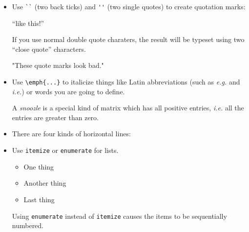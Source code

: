 \documentclass{article}
\begin{document}
\begin{itemize}
\item Use \verb|``| (two back ticks) and \verb|''| (two single quotes)
  to create quotation marks:
\begin{good}
``like this!''
\end{good}
If you use normal double quote charaters, the result will be typeset
using two ``close quote'' characters.
\begin{bad}
"These quote marks look bad."
\end{bad}

\item Use \verb|\emph{...}| to italicize things like Latin abbreviations
  (such as \emph{e.g.} and \emph{i.e.}) or words you are going to
  define.
\begin{good}
A \emph{snoozle} is a special kind of matrix which has all positive entries, \emph{i.e.} all the entries are greater than zero.
\end{good}
\item There are four kinds of horizontal lines:
\item Use \verb|itemize| or \verb|enumerate| for lists.
\begin{good}
\begin{itemize}
  \item One thing
  \item Another thing
  \item Last thing
\end{itemize}
\end{good}
  Using \verb|enumerate| instead of \verb|itemize| causes the items to
  be sequentially numbered.


\end{itemize}
\end{document}

